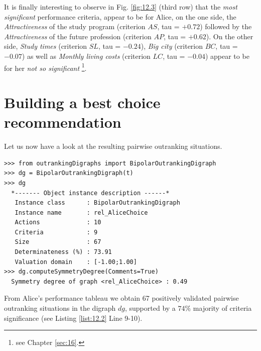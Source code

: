 It is finally interesting to observe in Fig. \ref{fig:12.3} (third row) that the \emph{most significant} performance criteria, appear to be for Alice, on the one side, the \emph{Attractiveness} of the study program (criterion $AS$, tau = $+0.72$) followed by the \emph{Attractiveness} of the future profession (criterion $AP$, tau = $+0.62$). On the other side, \emph{Study times} (criterion $SL$, tau = $-0.24$), \emph{Big city} (criterion $BC$, tau = $-0.07$) as well as \emph{Monthly living costs} (criterion $LC$, tau = $-0.04$) appear to be for her  \emph{not so significant} \footnote{see Chapter \ref{sec:16}.}.


\section{Building a best choice recommendation}
\label{sec:12.3}

Let us now have a look at the resulting pairwise outranking situations.

\begin{lstlisting}[caption={Computing Alice's outranking digraph},label=list:12.2]
>>> from outrankingDigraphs import BipolarOutrankingDigraph
>>> dg = BipolarOutrankingDigraph(t) 
>>> dg
  *------- Object instance description ------*
   Instance class      : BipolarOutrankingDigraph
   Instance name       : rel_AliceChoice
   Actions             : 10
   Criteria            : 9
   Size                : 67
   Determinateness (%) : 73.91
   Valuation domain    : [-1.00;1.00]
>>> dg.computeSymmetryDegree(Comments=True)
  Symmetry degree of graph <rel_AliceChoice> : 0.49
\end{lstlisting}
From Alice's performance tableau we obtain 67 positively validated pairwise outranking situations in the digraph $dg$, supported by a $74\%$ majority of criteria significance (see Listing \ref{list:12.2} Line 9-10).

